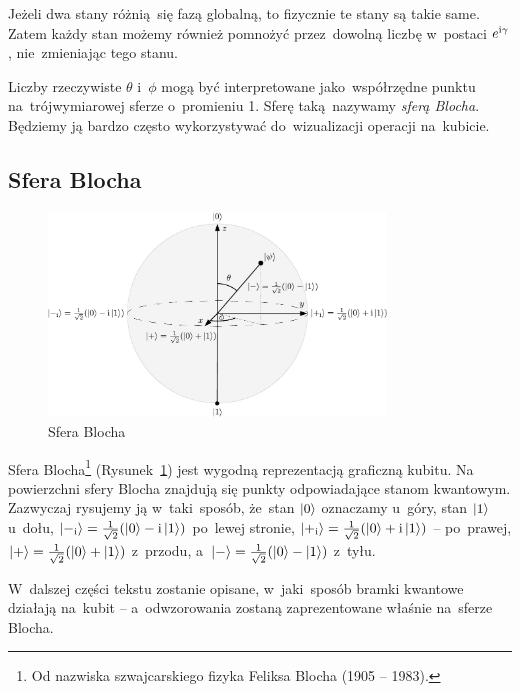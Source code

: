 Jeżeli dwa stany różnią~się fazą globalną, to fizycznie te stany są takie
same. Zatem każdy stan możemy również pomnożyć przez~dowolną liczbę w~postaci
$e^{{\mathrm i}\gamma}$, nie~zmieniając tego stanu.

Liczby rzeczywiste $\theta$ i~$\phi$ mogą być interpretowane jako~współrzędne
punktu na~trójwymiarowej sferze o~promieniu 1. Sferę taką~nazywamy
\emph{sferą Blocha}. Będziemy ją bardzo często wykorzystywać
do~wizualizacji operacji na~kubicie.

\subsection{Sfera Blocha}
\begin{figure}[h]
	\begin{center}
		\includegraphics[width=0.8\textwidth]{pics/bloch}
	\end{center}
	\caption{Sfera Blocha}
	\label{rys:sferablocha}
\end{figure}
Sfera Blocha\footnote{Od nazwiska szwajcarskiego fizyka Feliksa Blocha
	(1905 -- 1983).} (Rysunek~\ref{rys:sferablocha}) jest wygodną
reprezentacją graficzną kubitu. Na powierzchni sfery Blocha znajdują się
punkty odpowiadające stanom kwantowym. Zazwyczaj rysujemy ją
w~taki~sposób, że~stan $\ket{0}$ oznaczamy u~góry, stan $\ket{1}$
u~dołu,
$\ket{-_{\mathrm i}}=\frac{1}{\sqrt{2}} (\ket{0}-{\mathrm i}\ket{1})$ po~lewej stronie,
$\ket{+_{\mathrm i}}=\frac{1}{\sqrt{2}}
	(\ket{0}+{\mathrm i}\ket{1})$ -- po~prawej, $\ket{+}=\frac{1}{\sqrt{2}} (\ket{0}+\ket{1})$ z~przodu,
a~$\ket{-}=\frac{1}{\sqrt{2}} (\ket{0}-\ket{1})$ z~tyłu.

W~dalszej części tekstu zostanie opisane, w~jaki~sposób bramki kwantowe działają
na~kubit -- a~odwzorowania zostaną zaprezentowane właśnie na~sferze Blocha.

